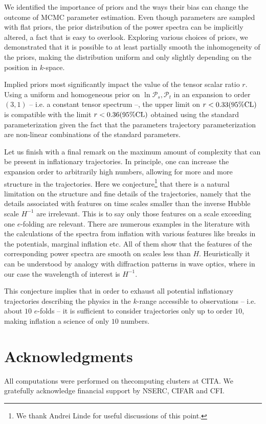 \documentclass[a4paper,11pt]{article}
\newcommand{\pscalar}{{\mathcal{P}_s}}
\newcommand{\ptensor}{{\mathcal{P}_t}}
\begin{document}
We identified the importance of priors and the ways their bias can
change the outcome of MCMC parameter estimation. Even though
parameters are sampled with flat priors, the prior distribution of the
power spectra can be implicitly altered, a fact that is easy to
overlook. Exploring various choices of priors, we demonstrated that it
is possible to at least partially smooth the inhomogeneity of the
priors, making the distribution uniform and only slightly depending on
the position in $k$-space.

Implied priors most significantly impact the value of the tensor
scalar ratio $r$. Using a uniform and homogeneous prior on
$\ln\pscalar, \ptensor $ in an expansion to order $(3,1)$ --
i.e. a constant tensor spectrum --, the upper limit on
$r<0.33(95\%{\rm CL})$ is compatible with the limit $r<0.36(95\%{\rm CL})$
obtained using the standard parameterization given the fact that the
parameters trajectory parameterization are non-linear combinations of
the standard parameters. 

Let us finish with a final remark on the maximum amount of complexity
that can be present in inflationary trajectories. In principle, one
can increase the expansion order to arbitrarily high numbers, allowing
for more and more structure in the trajectories. Here we
conjecture\footnote{We thank Andrei Linde for useful discussions of
this point.} that there is a natural limitation on the structure and
fine details of the trajectories, namely that the details associated
with features on time scales smaller than the inverse Hubble scale
$H^{-1}$ are irrelevant. This is to say only those features on a scale
exceeding one $e$-folding are relevant. There are numerous examples in
the literature with the calculations of the spectra from inflation
with various features like breaks in the potentials, marginal
inflation etc. All of them show that the features of the corresponding
power spectra are smooth on scales less than $H$. Heuristically it can
be understood by analogy with diffraction patterns in wave optics,
where in our case the wavelength of interest is $H^{-1}$.

This conjecture implies that in order to exhaust all potential
inflationary trajectories describing the physics in the $k$-range
accessible to observations -- i.e. about $10$ $e$-folds -- it is
sufficient to consider trajectories only up to order $10$, making
inflation a science of only $10$ numbers.


\section*{Acknowledgments}
All computations were performed on thecomputing clusters at CITA. We gratefully acknowledge financial support by
NSERC, CIFAR and CFI.
\end{document}
